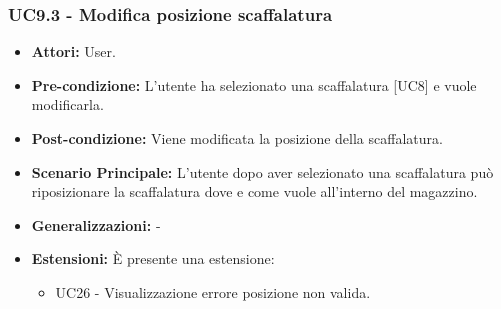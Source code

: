 \subsubsection{UC9.3 - Modifica posizione scaffalatura}
\begin{itemize}
    \item \textbf{Attori:} User.
    \item \textbf{Pre-condizione:} L'utente ha selezionato una scaffalatura [UC8] e vuole modificarla.
    \item \textbf{Post-condizione:} Viene modificata la posizione della scaffalatura.
    \item \textbf{Scenario Principale:} L'utente dopo aver selezionato una scaffalatura può riposizionare la scaffalatura dove e come vuole all'interno del magazzino.
    \item \textbf{Generalizzazioni:} -
    \item \textbf{Estensioni:} È presente una estensione:
    \begin{itemize}
        \item UC26 - Visualizzazione errore posizione non valida.
    \end{itemize}
\end{itemize}